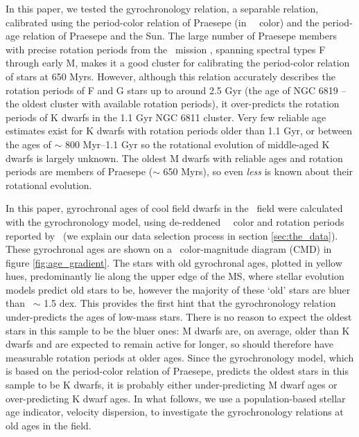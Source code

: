 In this paper, we tested the \citet{angus2019} gyrochronology relation, a
separable relation, calibrated using the period-color relation of Praesepe (in
\gaia\ \gcolor\ color) and the period-age relation of Praesepe and the Sun.
The large number of Praesepe members with precise rotation periods from the
\ktwo\ mission \citep{douglas2017, rebull2017}, spanning spectral types F
through early M, makes it a good cluster for calibrating the period-color
relation of stars at 650 Myrs.
However, although this relation accurately describes the rotation periods of F
and G stars up to around 2.5 Gyr (the age of NGC 6819 -- the oldest cluster
with available rotation periods), it over-predicts the rotation periods of K
dwarfs in the 1.1 Gyr NGC 6811 cluster.
Very few reliable age estimates exist for K dwarfs with rotation periods older
than 1.1 Gyr, or between the ages of $\sim$ 800 Myr--1.1 Gyr so the rotational
evolution of middle-aged K dwarfs is largely unknown.
The oldest M dwarfs with reliable ages and rotation periods are members of
Praesepe ($\sim$ 650 Myrs), so even {\it less} is known about their rotational
evolution.

In this paper, gyrochronal ages of cool field dwarfs in the \kepler\ field
were calculated with the \citep{angus2019} gyrochronology model, using
de-reddened \Gaia\ \gcolor\ color and rotation periods reported by \mct\ (we
explain our data selection process in section \ref{sec:the_data}).
These gyrochronal ages are shown on a \gaia\ color-magnitude diagram (CMD) in
figure \ref{fig:age_gradient}.
The stars with old gyrochronal ages, plotted in yellow hues, predominantly lie
along the upper edge of the MS, where stellar evolution models predict old
stars to be, however the majority of these `old' stars are bluer than \gcolor\
$\sim$ 1.5 dex.
This provides the first hint that the \citet{angus2019} gyrochronology
relation under-predicts the ages of low-mass stars.
There is no reason to expect the oldest stars in this sample to be the bluer
ones: M dwarfs are, on average, older than K dwarfs and are expected to remain
active for longer, so should therefore have measurable rotation periods at
older ages.
Since the \citet{angus2019} gyrochronology model, which is based on the
period-color relation of Praesepe, predicts the oldest stars in this sample to
be K dwarfs, it is probably either under-predicting M dwarf ages or
over-predicting K dwarf ages.
In what follows, we use a population-based stellar age indicator, velocity
dispersion, to investigate the gyrochronology relations at old ages in
the field.

